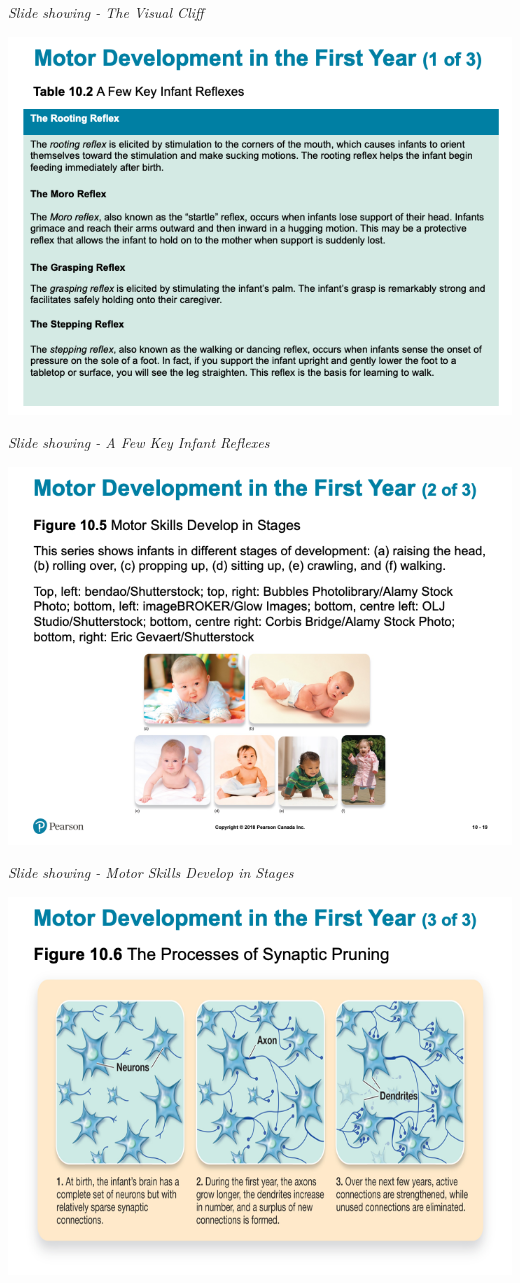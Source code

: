 \documentclass[
]{book}
\begin{document}
\begin{reflect}
\emph{Slide showing - The Visual Cliff}

\includegraphics{assets/unit_3/slide_18.png}

\emph{Slide showing - A Few Key Infant Reflexes}

\includegraphics{assets/unit_3/slide_19.png}

\emph{Slide showing - Motor Skills Develop in Stages}

\includegraphics{assets/unit_3/slide_20.png}


\end{reflect}
\end{document}
